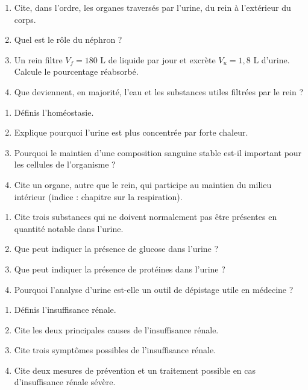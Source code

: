 \begin{enumerate}[label=\arabic*)]
\item Cite, dans l'ordre, les organes traversés par l'urine, du rein à l'extérieur du
corps.
\item Quel est le rôle du néphron ?
\item Un rein filtre $V_f=180$ L de liquide par jour et excrète $V_u=1{,}8$ L d'urine.
Calcule le pourcentage réabsorbé.
\item Que deviennent, en majorité, l'eau et les substances utiles filtrées par le
rein ?
\end{enumerate}

\begin{enumerate}[label=\arabic*)]
\item Définis l'homéostasie.
\item Explique pourquoi l'urine est plus concentrée par forte chaleur.
\item Pourquoi le maintien d'une composition sanguine stable est-il important pour les
cellules de l'organisme ?
\item Cite un organe, autre que le rein, qui participe au maintien du milieu intérieur
(indice : chapitre sur la respiration).
\end{enumerate}

\begin{enumerate}[label=\arabic*)]
\item Cite trois substances qui ne doivent normalement pas être présentes en quantité
notable dans l'urine.
\item Que peut indiquer la présence de glucose dans l'urine ?
\item Que peut indiquer la présence de protéines dans l'urine ?
\item Pourquoi l'analyse d'urine est-elle un outil de dépistage utile en médecine ?
\end{enumerate}

\begin{enumerate}[label=\arabic*)]
\item Définis l'insuffisance rénale.
\item Cite les deux principales causes de l'insuffisance rénale.
\item Cite trois symptômes possibles de l'insuffisance rénale.
\item Cite deux mesures de prévention et un traitement possible en cas
d'insuffisance rénale sévère.
\end{enumerate}

